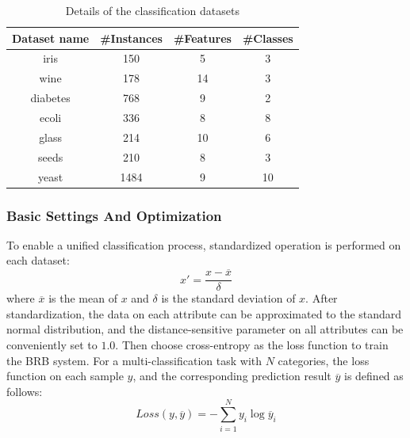 \documentclass{ieeeaccess}
\begin{document}
\begin{table}
    \caption{Details of the classification datasets}
    \centering
    \label{tab4}
    \begin{tabular}{cccc}
        \hline
        Dataset name & \#Instances & \#Features & \#Classes \\
        \hline
        iris         & 150         & 5          & 3         \\
        wine         & 178         & 14         & 3         \\
        diabetes     & 768         & 9          & 2         \\
        ecoli        & 336         & 8          & 8         \\
        glass        & 214         & 10         & 6         \\
        seeds        & 210         & 8          & 3         \\
        yeast        & 1484        & 9          & 10        \\
        \hline
    \end{tabular}
\end{table}



\subsubsection{Basic Settings And Optimization}
To enable a unified classification process,  standardized operation is performed on each dataset:
\begin{equation}
    x'=\frac{x-\overline{x}}{\delta}
\end{equation}
where $\overline{x}$ is the mean of $x$ and $\delta$ is the standard deviation of $x$.
After standardization, the data on each attribute can be approximated to the standard normal distribution,
and the distance-sensitive parameter on all attributes can be conveniently set to $1.0$.
Then choose cross-entropy as the loss function to train the BRB system.
For a multi-classification task with $N$ categories, the loss function on each sample $y$, and the corresponding prediction result $\overline{y}$ is defined as follows:
\begin{equation}
    Loss(y,\overline{y})=-\sum_{i=1}^Ny_{i}\log\overline{y}_i
\end{equation}
\end{document}

